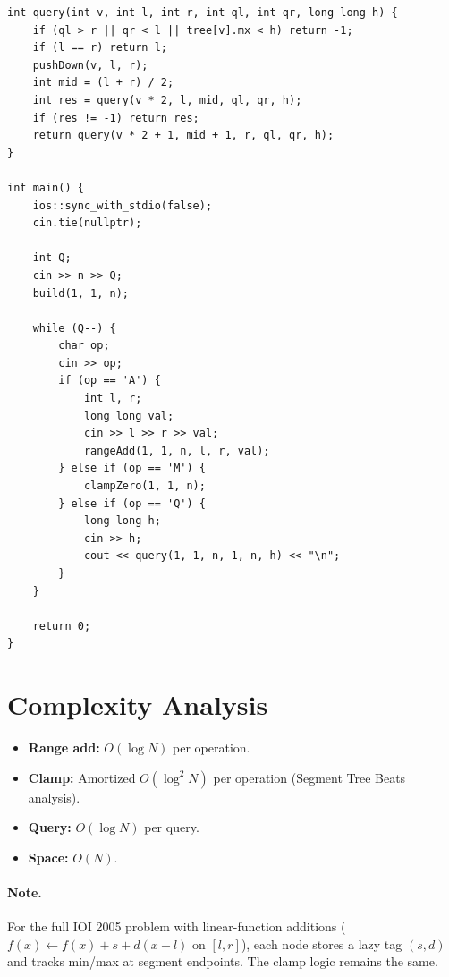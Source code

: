 \documentclass[11pt,a4paper]{article}
\begin{document}
\begin{lstlisting}
int query(int v, int l, int r, int ql, int qr, long long h) {
    if (ql > r || qr < l || tree[v].mx < h) return -1;
    if (l == r) return l;
    pushDown(v, l, r);
    int mid = (l + r) / 2;
    int res = query(v * 2, l, mid, ql, qr, h);
    if (res != -1) return res;
    return query(v * 2 + 1, mid + 1, r, ql, qr, h);
}

int main() {
    ios::sync_with_stdio(false);
    cin.tie(nullptr);

    int Q;
    cin >> n >> Q;
    build(1, 1, n);

    while (Q--) {
        char op;
        cin >> op;
        if (op == 'A') {
            int l, r;
            long long val;
            cin >> l >> r >> val;
            rangeAdd(1, 1, n, l, r, val);
        } else if (op == 'M') {
            clampZero(1, 1, n);
        } else if (op == 'Q') {
            long long h;
            cin >> h;
            cout << query(1, 1, n, 1, n, h) << "\n";
        }
    }

    return 0;
}
\end{lstlisting}

\section{Complexity Analysis}
\begin{itemize}
  \item \textbf{Range add:} $O(\log N)$ per operation.
  \item \textbf{Clamp:} Amortized $O(\log^2 N)$ per operation (Segment
        Tree Beats analysis).
  \item \textbf{Query:} $O(\log N)$ per query.
  \item \textbf{Space:} $O(N)$.
\end{itemize}

\paragraph{Note.} For the full IOI 2005 problem with linear-function
additions ($f(x) \gets f(x) + s + d(x - l)$ on $[l, r]$), each node
stores a lazy tag $(s, d)$ and tracks min/max at segment endpoints. The
clamp logic remains the same.
\end{document}

